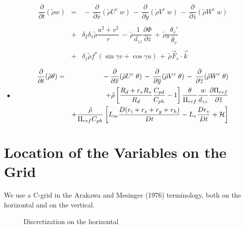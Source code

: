 \begin{itemize}
\begin{eqnarray}
& & \nonumber \\
\dfrac{\partial}{\partial t}(\tilde{\rho} w) &= &
 \, - \, \dfrac{\partial }{\partial \overline{x}} (\tilde{\rho} U^{c} \;  w)
 \, - \, \dfrac{\partial }{\partial \overline{y}} (\tilde{\rho} V^{c} \;  w )
 \, - \, \dfrac{\partial }{\partial \overline{z}} (\tilde{\rho} W^{c} \;  w)
\nonumber \\ & & \nonumber \\
 & + & \delta _{2}\delta _{1}\tilde{\rho}\dfrac{ u ^{2}+ v ^{2} }{r}
 \,  - \, \tilde{\rho}\dfrac{1}{d_{zz}}
\dfrac{\partial \Phi}{\partial \overline{z}}
 \, + \,\tilde{\rho} g \dfrac{\theta_v ' }{\overline{\theta}_v}\nonumber \\
& & \nonumber \\
&  + &\delta _{1}\tilde{\rho} f^* (\sin\gamma  v  + \cos\gamma  u )
 \, + \, \tilde{\rho} \vec{F}_{v} \cdot \vec{k}
 \end{eqnarray}

\item{}

\begin{eqnarray}
\dfrac{\partial}{\partial t}(\tilde{\rho}\theta) &=& \, - \,
 \dfrac{\partial }{\partial \overline{x}} (\tilde{\rho} U^{c} \;  \theta)
 \, - \, \dfrac{\partial }{\partial \overline{y}} (\tilde{\rho} V^{c} \;  \theta )
\, - \, \dfrac{\partial }{\partial \overline{z}} (\tilde{\rho} W^{c} \;  \theta)
\nonumber \\ & &
+\tilde{\rho} \left[ {R_d+r_vR_v\over R_d}{C_{pd} \over C_{ph}}-1 \right]
{\theta \over \Pi_{ref}} {w \over d_{zz} }
 {\partial \Pi_{ref} \over \partial \overline{z}}
\nonumber \\ & &
+ {\tilde{\rho}\over \Pi_{ref} C_{ph}} \left[
 L_m {D(r_i+r_s+r_g+r_h)\over Dt} - L_v {Dr_v\over Dt} + {\cal H}  \right]
\end{eqnarray}
\end{itemize}


\section{Location of the Variables on the Grid}

We use a C-grid in the Arakawa and Mesinger (1976) terminology,
both on the horizontal and on the vertical.

\begin{figure}[pbh]
\vspace{1cm}
\caption{Discretization on the horizontal \label{horizgrid}}
\end{figure}

